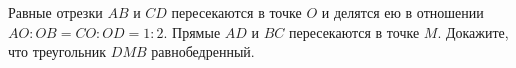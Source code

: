 \begin{ex}
	\begin{condition}
		Равные отрезки \( AB \) и \( CD  \) пересекаются в точке \( O \) и делятся ею в отношении \( AO : OB = CO : OD = 1 : 2 \). Прямые \( AD  \) и \( BC  \) пересекаются в точке \( M  \). Докажите, что треугольник \( DMB  \) равнобедренный.
	\end{condition}
\end{ex}